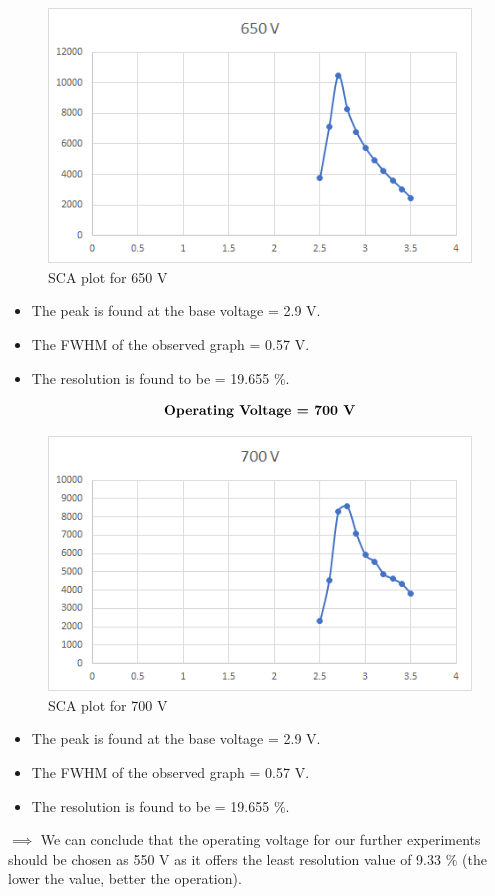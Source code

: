 \documentclass[%
 reprint,
nofootinbib,
 amsmath,amssymb,
 aps,
floatfix,
]{revtex4-2}
\begin{document}
\begin{figure}[H]
    \centering
    \includegraphics[width = 8 cm]{Figures/650.png}
    \caption{SCA plot for 650 V}
    \label{fig:my_label}
\end{figure}

\begin{itemize}
    \item The peak is found at the base voltage = 2.9 V.
    \item The FWHM of the observed graph = 0.57 V.
    \item The resolution is found to be = 19.655 \%.
\end{itemize}

\begin{align*}
    \centering \textbf{Operating Voltage = 700 V}
\end{align*}
\begin{figure}[H]
    \centering
    \includegraphics[width = 8 cm]{Figures/700.png}
    \caption{SCA plot for 700 V}
    \label{fig:my_label}
\end{figure}

\begin{itemize}
    \item The peak is found at the base voltage = 2.9 V.
    \item The FWHM of the observed graph = 0.57 V.
    \item The resolution is found to be = 19.655 \%.
\end{itemize}
$\implies$ We can conclude that the operating voltage for our further experiments should be chosen as 550 V as it offers the least resolution value of 9.33 $\%$ (the lower the value, better the operation).
\end{document}

